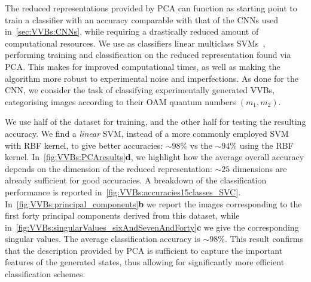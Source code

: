 The reduced representations provided by \ac{PCA} can function as starting point to train a classifier with an accuracy comparable with that of the \acp{CNN} used in~\cref{sec:VVBs:CNNs}, while requiring a drastically reduced amount of computational resources.
We use as classifiers linear multiclass \acp{SVM}~\cite{hearst1998support,shawe2000support}, performing training and classification on the reduced representation found via \ac{PCA}. This makes for improved computational times, as well as making the algorithm more robust to experimental noise and imperfections.
As done for the \ac{CNN}, we consider the task of classifying experimentally generated VVBs, categorising images according to their OAM quantum numbers $(m_1,m_2)$.

We use half of the dataset for training, and the other half for testing the resulting accuracy.
We find a \emph{linear} SVM, instead of a more commonly employed SVM with RBF kernel, to give better accuracies: $\sim98\%$ vs the $\sim94\%$ using the RBF kernel.
In~\cref{fig:VVBs:PCAresults}\textbf{d}, we highlight how the average overall accuracy depends on the dimension of the reduced representation: $\sim 25$ dimensions are already sufficient for good accuracies.
A breakdown of the classification performance is reported in~\cref{fig:VVBs:accuracies15classes_SVC}.
In~\cref{fig:VVBs:principal_components}\textbf{b} we report the images corresponding to the first forty principal components derived from this dataset, while in~\cref{fig:VVBs:singularValues_sixAndSevenAndForty}\textbf{c} we give the corresponding singular values.
The average classification accuracy is $\sim 98 \%$. This result confirms that the description provided by \ac{PCA} is sufficient to capture the important features of the generated states, thus allowing for significantly more efficient classification schemes.

